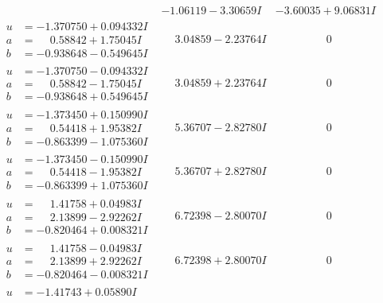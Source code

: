 \documentclass[1p]{elsarticle_modified}
\theoremstyle{definition}
\begin{document}
$$\begin{array}{c|c|c}
 & -1.06119 - 3.30659 I & -3.60035 + 9.06831 I \\ \hline\begin{aligned}
u &= -1.370750 + 0.094332 I \\
a &= \phantom{-}0.58842 + 1.75045 I \\
b &= -0.938648 - 0.549645 I\end{aligned}
 & \phantom{-}3.04859 - 2.23764 I & \phantom{-0.000000 } 0 \\ \hline\begin{aligned}
u &= -1.370750 - 0.094332 I \\
a &= \phantom{-}0.58842 - 1.75045 I \\
b &= -0.938648 + 0.549645 I\end{aligned}
 & \phantom{-}3.04859 + 2.23764 I & \phantom{-0.000000 } 0 \\ \hline\begin{aligned}
u &= -1.373450 + 0.150990 I \\
a &= \phantom{-}0.54418 + 1.95382 I \\
b &= -0.863399 - 1.075360 I\end{aligned}
 & \phantom{-}5.36707 - 2.82780 I & \phantom{-0.000000 } 0 \\ \hline\begin{aligned}
u &= -1.373450 - 0.150990 I \\
a &= \phantom{-}0.54418 - 1.95382 I \\
b &= -0.863399 + 1.075360 I\end{aligned}
 & \phantom{-}5.36707 + 2.82780 I & \phantom{-0.000000 } 0 \\ \hline\begin{aligned}
u &= \phantom{-}1.41758 + 0.04983 I \\
a &= \phantom{-}2.13899 - 2.92262 I \\
b &= -0.820464 + 0.008321 I\end{aligned}
 & \phantom{-}6.72398 - 2.80070 I & \phantom{-0.000000 } 0 \\ \hline\begin{aligned}
u &= \phantom{-}1.41758 - 0.04983 I \\
a &= \phantom{-}2.13899 + 2.92262 I \\
b &= -0.820464 - 0.008321 I\end{aligned}
 & \phantom{-}6.72398 + 2.80070 I & \phantom{-0.000000 } 0 \\ \hline\begin{aligned}
u &= -1.41743 + 0.05890 I \\

\end{aligned}
\end{array}$$
\end{document}
